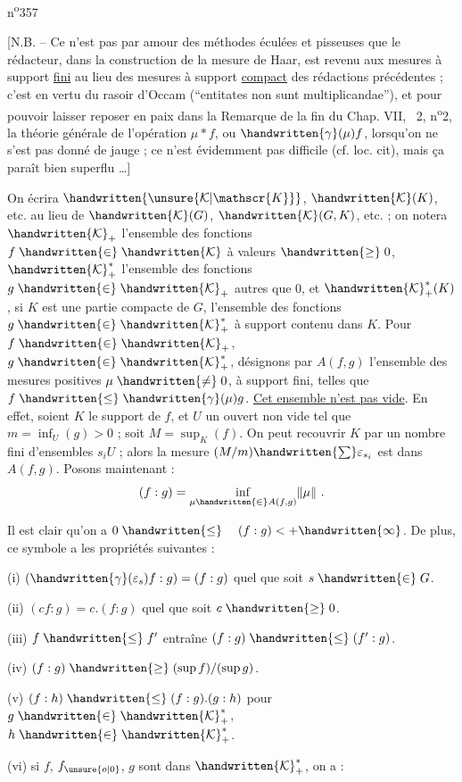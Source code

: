 n\textsuperscript{o}357

[N.B. -- Ce n'est pas par amour des méthodes éculées et pisseuses que le rédacteur, dans la construction de la mesure de Haar, est revenu aux mesures à support \uline{fini} au lieu des mesures à support \uline{compact} des rédactions précédentes ; c'est en vertu du rasoir d'Occam (``entitates non sunt multiplicandae''), et pour pouvoir laisser reposer en paix dans la Remarque de la fin du Chap. VII, \handwritten{\S}\ 2, n\textsuperscript{o}2, la théorie générale de l'opération $\mu\ast f$, ou $\handwritten{\gamma}(\mu)f$, lorsqu'on ne s'est pas donné de jauge ; ce n'est évidemment pas difficile (cf. loc. cit), mais ça paraît bien superflu \ldots]

On écrira $\handwritten{\unsure{\mathcal{K}|\mathscr{K}}}$, $\handwritten{\mathcal{K}}(K)$, etc. au lieu de $\handwritten{\mathcal{K}}(G)$, $\handwritten{\mathcal{K}}(G,K)$, etc. ; on notera $\handwritten{\mathcal{K}}_+$ l'ensemble des fonctions $f\mathrel{\handwritten{\in}}\handwritten{\mathcal{K}}$ à valeurs $\mathrel{\handwritten{\geq}}0$, $\handwritten{\mathcal{K}}^{\ast}_{+}$ l'ensemble des fonctions $g\mathrel{\handwritten{\in}}\handwritten{\mathcal{K}}_+$ autres que $0$, et $\handwritten{\mathcal{K}}^{\ast}_{+}(K)$, si $K$ est une partie compacte de $G$, l'ensemble des fonctions $g\mathrel{\handwritten{\in}}\handwritten{\mathcal{K}}^{\ast}_{+}$ à support contenu dans $K$. Pour $f\mathrel{\handwritten{\in}}\handwritten{\mathcal{K}}_+$, $g\mathrel{\handwritten{\in}}\handwritten{\mathcal{K}}^{\ast}_{+}$, désignons par $A(f,g)$ l'ensemble des mesures positives $\mu\mathrel{\handwritten{\ne}}0$, à support fini, telles que $f\mathrel{\handwritten{\leq}}\handwritten{\gamma}(\mu)g$. \uline{Cet ensemble n'est pas vide}. En effet, soient $K$ le support de $f$, et $U$ un ouvert non vide tel que $m=\inf_U(g)>0$ ; soit $M=\sup_K(f)$. On peut recouvrir $K$ par un nombre fini d'ensembles $s_i U$ ; alors la mesure $(M/m)\handwritten{\sum}\varepsilon_{s_i}$ est dans $A(f,g)$. Posons maintenant :
\[
(f:g)=\inf_{\mu\mathrel{\handwritten{\in}} A(f,g)}\lVert\mu\rVert\ .
\]

Il est clair qu'on a $0\mathrel{\handwritten{\leq}}\quad(f:g)<+\handwritten{\infty}$. De plus, ce symbole a les propriétés suivantes :

(i) \quad $(\handwritten{\gamma}(\varepsilon_s)f:g)=(f:g)$ quel que soit $s\mathrel{\handwritten{\in}}G$.

(ii) \quad $(cf:g)=c.(f:g)$ quel que soit $c\mathrel{\handwritten{\geq}}0$.

(iii) \quad $f\mathrel{\handwritten{\leq}} f'$ entraîne $(f:g)\mathrel{\handwritten{\leq}}(f':g)$.

(iv) \quad $(f:g)\mathrel{\handwritten{\geq}}(\sup f)/(\sup g)$.

(v) \quad $(f:h)\mathrel{\handwritten{\leq}}(f:g).(g:h)$ pour $g\mathrel{\handwritten{\in}}\handwritten{\mathcal{K}}^{\ast}_{+}$, $h\mathrel{\handwritten{\in}}\handwritten{\mathcal{K}}^{\ast}_{+}$.

(vi) \quad si $f$, $f_{\unsure{o|0}}$, $g$ sont dans $\handwritten{\mathcal{K}}^{\ast}_{+}$, on a :

